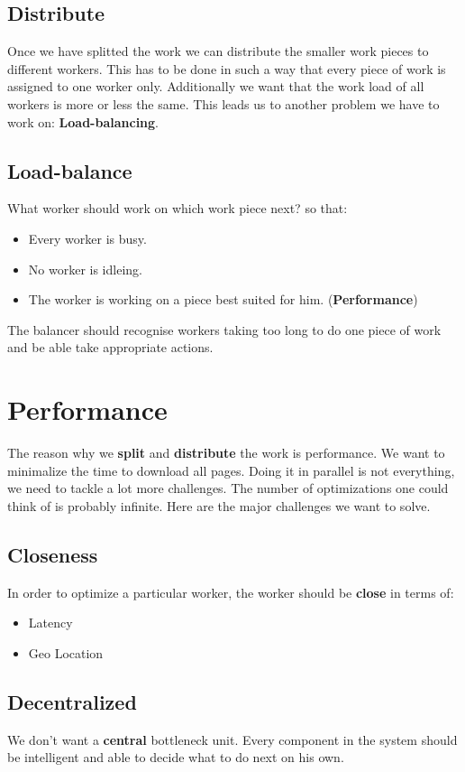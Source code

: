 \subsection{Distribute}
Once we have splitted the work we can distribute the smaller work pieces to different workers. This has to be done in such a way that every piece of work is assigned to one worker only. Additionally we want that the work load of all workers is more or less the same. This leads us to another problem we have to work on: \textbf{Load-balancing}.
\subsection{Load-balance}
What worker should work on which work piece next? so that:
\begin{itemize}
\item Every worker is busy.
\item No worker is idleing.
\item The worker is working on a piece best suited for him. (\textbf{Performance})
\end{itemize}
The balancer should recognise workers taking too long to do one piece of work and be able take appropriate actions.

\section{Performance}
The reason why we \textbf{split} and \textbf{distribute} the work is performance. We want to minimalize the time to download all pages. Doing it in parallel is not everything, we need to tackle a lot more challenges. The number of optimizations one could think of is probably infinite. Here are the major challenges we want to solve.
\subsection{Closeness}
\label{closeness}
In order to optimize a particular worker, the worker should be \textbf{close} in terms of:
\begin{itemize}
\item Latency
\item Geo Location
\end{itemize}
\subsection{Decentralized}
We don't want a \textbf{central} bottleneck unit. Every component in the system should be intelligent and able to decide what to do next on his own.
